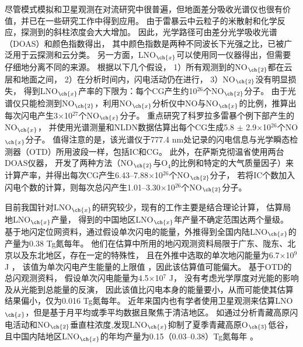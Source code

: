 尽管模式模拟和卫星观测在对流研究中很普遍，但地面差分吸收光谱仪也很有价值，并已在一些研究工作中得到应用。
由于雷暴云中云粒子的米散射和化学反应，探测到的斜柱浓度会大大增加\citep{Erle.1995,Pfeilsticker.1998,Winterrath.1999}。
因此，光学路径可由差分光学吸收光谱（DOAS）和颜色指数得出\citep{Veitel.1998,Wagner.1998}，
其中颜色指数是两种不同波长下光强之比，已被广泛用于云探测和云分类\citep{Wagner.2014,Wang.2015,Wagner.2016}。
另一方面，LNO$_{\ch{x}}$可以使用同一仪器得出，但需要仔细地分离不同的来源。
\citet{Noxon.1976}根据以下几个假设，
1）所有观测到的NO$_{\ch{2}}$都在云层和地面之间，
2）在分析时间内，闪电活动仍在进行，
3）NO$_{\ch{2}}$没有明显损失，
得到LNO$_{\ch{x}}$产率的下限为：每个CG产生约10$^{26}$个NO$_{\ch{2}}$分子。
由于光谱仪只能检测到NO$_{\ch{2}}$，\citet{Franzblau.1989}利用NO$_{\ch{x}}$分析仪中NO与NO$_{\ch{x}}$的比例，推算出每次闪电产生3$\times$10$^{27}$个NO$_{\ch{x}}$分子。
\citet{Langford.2004}重点研究了科罗拉多雷暴个例下部产生的NO$_{\ch{x}}$，
并使用光谱测量和NLDN数据估算出每个CG生成5.8 $\pm$ 2.9$\times$10$^{26}$个NO$_{\ch{x}}$分子。
值得注意的是，该光谱仪于777.4 nm处记录的闪电信息与光学瞬态检测器（OTD）所用波段一样，包括IC和CG。
此外，\citet{Fraser.2007}在萨斯克彻温省使用两台DOAS仪器，
开发了两种方法（NO$_{\ch{2}}$与O$_4$的比例和特定的大气质量因子）来计算产率，并得出每次CG产生6.43--7.88$\times$10$^{26}$个NO$_{\ch{2}}$分子，
若将IC个数加入闪电个数的计算，则每次总闪产生1.01--3.30$\times$10$^{26}$个NO$_{\ch{2}}$分子。

目前我国针对LNO$_{\ch{x}}$的研究较少，现有的工作主要是结合理论计算，
估算局地LNO$_{\ch{x}}$产量\citep{DuJian.2002,ZhangYiJun.2002,ZhouYunJun.2002}，
得到的中国地区LNO$_{\ch{x}}$年产量不确定范围达两个量级。
\citet{ZhouYunJun.2004}基于地闪定位网资料，通过假设单次闪电的能量，外推得到全国内陆LNO$_{\ch{x}}$的产量为0.38 Tg氮每年。
他们在估算中所用的地闪观测资料局限于广东、陇东、北京以及东北地区，存在一定的特殊性，
且在外推中选取的单次地闪能量为6.7$\times$10$^9$ J \citep{Price.1997a,Price.1997b}，
该值为单次闪电产生能量的上限值 \citep{Wang.1998}，因此该估算值可能偏大。
\citet{SunAnPing.2004}基于OTD的总闪观测资料，
假设单次闪电能量为4.5$\times$10$^7$ J，
没有考虑光学厚度对光能的影响及从光能到总能量的反演，
因此该值比闪电本身的能量要小，从而可能使其估算结果偏小，仅为0.016 Tg氮每年。
近年来国内也有学者使用卫星观测来估算LNO$_{\ch{x}}$，但是基于月平均或季平均数据且聚焦于清洁地区。
如通过分析青藏高原闪电活动和NO$_{\ch{2}}$垂直柱浓度,发现LNO$_{\ch{x}}$抑制了夏季青藏高原O$_{\ch{3}}$低谷，且中国内陆地区LNO$_{\ch{x}}$的年均产量为0.15（0.03--0.38）Tg氮每年 \citep{JuXiaoYu.2015,Guo.2017,GuoFengXia.2019,Li.2022}。


